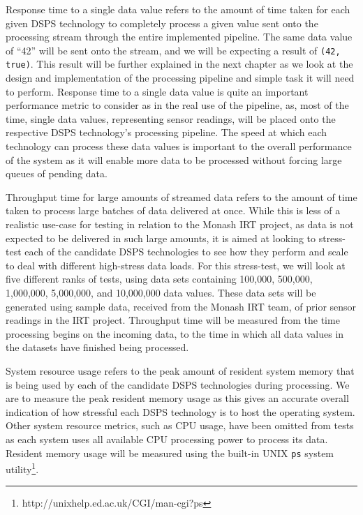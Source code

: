 Response time to a single data value refers to the amount of time taken for each given DSPS technology to completely
process a given value sent onto the processing stream through the entire implemented pipeline. The same data value of
``42'' will be sent onto the stream, and we will be expecting a result of \texttt{(42, true)}. This result will be
further explained in the next chapter as we look at the design and implementation of the processing pipeline and simple
task it will need to perform. Response time to a single data value is quite an important performance metric to consider
as in the real use of the pipeline, as, most of the time, single data values, representing sensor readings, will be placed
onto the respective DSPS technology's processing pipeline. The speed at which each technology can process these data
values is important to the overall performance of the system as it will enable more data to be processed without forcing
large queues of pending data.

Throughput time for large amounts of streamed data refers to the amount of time taken to process large batches of data
delivered at once. While this is less of a realistic use-case for testing in relation to the Monash IRT project, as data
is not expected to be delivered in such large amounts, it is aimed at looking to stress-test each of the candidate DSPS
technologies to see how they perform and scale to deal with different high-stress data loads. For this stress-test, we
will look at five different ranks of tests, using data sets containing 100,\@000, 500,\@000, 1,\@000,\@000, 5,\@000,\@000, and
10,\@000,\@000 data values. These data sets will be generated using sample data, received from the Monash IRT team, of
prior sensor readings in the IRT project. Throughput time will be measured from the time processing begins on the incoming
data, to the time in which all data values in the datasets have finished being processed.

System resource usage refers to the peak amount of resident system memory that is being used by each of the candidate DSPS
technologies during processing. We are to measure the peak resident memory usage as this gives an accurate overall indication of
how stressful each DSPS technology is to host the operating system. Other system resource metrics, such as CPU usage, have
been omitted from tests as each system uses all available CPU processing power to process its data. Resident memory usage
will be measured using the built-in UNIX \texttt{ps} system utility\footnote{http://unixhelp.ed.ac.uk/CGI/man-cgi?ps}.


